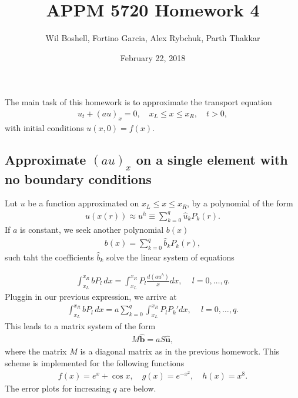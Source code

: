 \documentclass{article}
\title{APPM 5720 Homework 4}
\author{Wil Boshell, Fortino Garcia, Alex Rybchuk, Parth Thakkar}
\date{February 22, 2018}
\begin{document}
\maketitle

\maketitle

\noindent The main task of this homework is to approximate the transport equation
	\begin{align*}
		u_t + \left( a u\right)_x = 0, \quad x_L \leq x \leq x_R, \quad t > 0,
	\end{align*}
with initial conditions $u(x,0) = f(x)$.
\subsection{Approximate $\left( a u\right)_x $ on a single element with no boundary conditions}
Lut $u$ be a function approximated on $x_L \leq x \leq x_R$, by a polynomial of the form
	\begin{align*}
			u(x(r)) \approx u^h \equiv \sum_{k=0}^q \hat{u}_kP_k(r).
	\end{align*}
If $a$ is constant, we seek another polynomial $b(x)$
	\begin{align*}
		b(x) = \sum_{k=0}^q \hat{b}_kP_k(r),
	\end{align*}
such taht the coefficients $\hat{b}_k$ solve the linear system of equations

	\begin{align*}	
		\int_{x_L}^{x_R}bP_l\, dx = \int_{x_L}^{x_R} P_l \frac{d(au^h)}{x} dx, \, \quad l = 0,\dots,q.
	\end{align*}	
Pluggin in our previous expression, we arrive at 
	\begin{align*}	
		\int_{x_L}^{x_R}bP_l\, dx = a \sum_{k=0}^q \int_{x_L}^{x_R} P_l P_k' dx, \, \quad l = 0,\dots,q.
	\end{align*}
This leads to a matrix system of the form
	\begin{align*}
		M \boldsymbol{\hat{b}} = a S \boldsymbol{\hat{u}},
	\end{align*}
where the matrix $M$ is a diagonal matrix as in the previous homework. This scheme is implemented for the following functions
	\begin{align*}
		f(x) = e^x + \cos x, \quad g(x) = e^{-x^2}, \quad h(x) = x^8.
	\end{align*}
The error plots for increasing $q$ are below.
\end{document}
